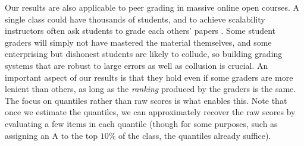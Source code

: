 Our results are also applicable to peer grading in massive online open courses. 
A single class could have thousands of students, 
and to achieve scalability instructors often ask students to grade each others' 
papers \citep{kulkarni2015peer,piech2013tuned}. 
Some student graders will simply not have mastered the material themselves, 
and some enterprising but dishonest students are likely to collude, 
so building grading systems that are robust to large errors as well as 
collusion is crucial. 
An important aspect of our results is that they hold even if some graders are 
more lenient than others, as long as the \emph{ranking} produced by the graders 
is the same. The focus on quantiles rather than raw scores is what enables this. 
Note that once we estimate the quantiles, we can approximately recover the 
raw scores by evaluating a few items in each quantile (though for some purposes, 
such as assigning an A to the top $10\%$ of the class, the quantiles already suffice).



